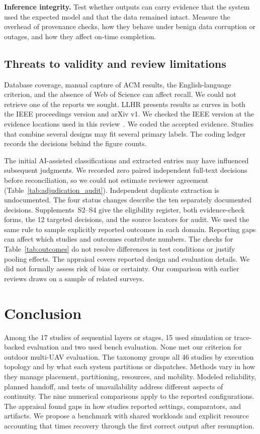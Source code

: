 \documentclass[journal]{IEEEtran}
\begin{document}
\textbf{Inference integrity.}
Test whether outputs can carry evidence that the system used the expected model and that the data remained intact. Measure the overhead of provenance checks, how they behave under benign data corruption or outages, and how they affect on-time completion.

\subsection{Threats to validity and review limitations}
Database coverage, manual capture of ACM results, the English-language criterion, and the absence of Web of Science can affect recall. We could not retrieve one of the reports we sought. LLHR presents results as curves in both the IEEE proceedings version and arXiv v1. We checked the IEEE version at the evidence locations used in this review~\cite{R0082}. We coded the accepted evidence. Studies that combine several designs may fit several primary labels. The coding ledger records the decisions behind the figure counts.

The initial AI-assisted classifications and extracted entries may have influenced subsequent judgments. We recorded zero paired independent full-text decisions before reconciliation, so we could not estimate reviewer agreement (Table~\ref{tab:adjudication_audit}). Independent duplicate extraction is undocumented. The four status changes describe the ten separately documented decisions. Supplements~S2--S4 give the eligibility register, both evidence-check forms, the 12 targeted decisions, and the source locators for audit. We used the same rule to sample explicitly reported outcomes in each domain. Reporting gaps can affect which studies and outcomes contribute numbers. The checks for Table~\ref{tab:outcomes} do not resolve differences in test conditions or justify pooling effects. The appraisal covers reported design and evaluation details. We did not formally assess risk of bias or certainty. Our comparison with earlier reviews draws on a sample of related surveys.

\section{Conclusion}\label{sec:conclusion}
Among the 17 studies of sequential layers or stages, 15 used simulation or trace-backed evaluation and two used bench evaluation. None met our criterion for outdoor multi-UAV evaluation. The taxonomy groups all 46 studies by execution topology and by what each system partitions or dispatches. Methods vary in how they manage placement, partitioning, resources, and mobility. Modeled reliability, planned handoff, and tests of unavailability address different aspects of continuity. The nine numerical comparisons apply to the reported configurations. The appraisal found gaps in how studies reported settings, comparators, and artifacts. We propose a benchmark with shared workloads and explicit resource accounting that times recovery through the first correct output after resumption.
\end{document}

